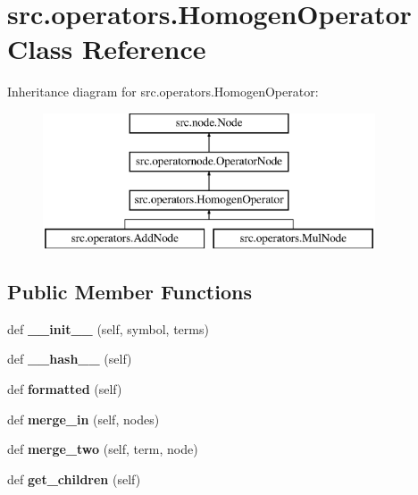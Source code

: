 \hypertarget{classsrc_1_1operators_1_1HomogenOperator}{}\section{src.\+operators.\+Homogen\+Operator Class Reference}
\label{classsrc_1_1operators_1_1HomogenOperator}
Inheritance diagram for src.\+operators.\+Homogen\+Operator\+:\begin{figure}[H]
\begin{center}
\leavevmode
\includegraphics[height=4.000000cm]{classsrc_1_1operators_1_1HomogenOperator}
\end{center}
\end{figure}
\subsection*{Public Member Functions}
\begin{DoxyCompactItemize}
\item 
\mbox{\label{classsrc_1_1operators_1_1HomogenOperator_a16a31d31bd2cf3587179af6a9686c827}} 
def {\bfseries \+\_\+\+\_\+init\+\_\+\+\_\+} (self, symbol, terms)
\item 
\mbox{\label{classsrc_1_1operators_1_1HomogenOperator_a89cdd651ea377c8b8460f4afd1f11c43}} 
def {\bfseries \+\_\+\+\_\+hash\+\_\+\+\_\+} (self)
\item 
\mbox{\label{classsrc_1_1operators_1_1HomogenOperator_a35d32a7d4d52e7fba6720ba2b70cd3e0}} 
def {\bfseries formatted} (self)
\item 
\mbox{\label{classsrc_1_1operators_1_1HomogenOperator_a0bd55b6ad580d42bd11300ac43733d53}} 
def {\bfseries merge\+\_\+in} (self, nodes)
\item 
\mbox{\label{classsrc_1_1operators_1_1HomogenOperator_a2bb7c65aa50bcce6c4e70a7e0a9efff4}} 
def {\bfseries merge\+\_\+two} (self, term, node)
\item 
\mbox{\label{classsrc_1_1operators_1_1HomogenOperator_addaed624b21630ff5c19bddfafab1d7b}} 
def {\bfseries get\+\_\+children} (self)
\end{DoxyCompactItemize}

